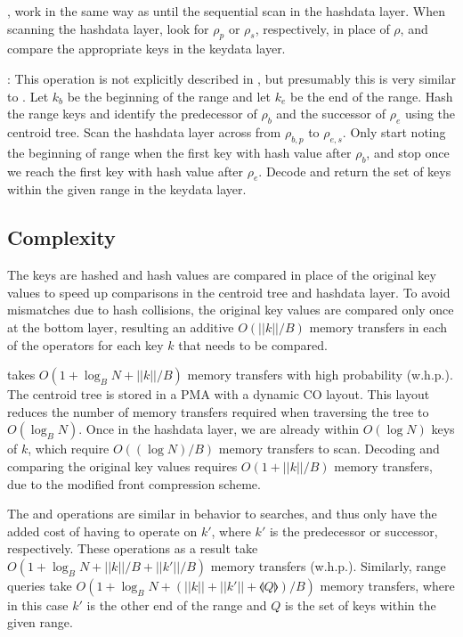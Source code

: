 \documentclass[preprint]{style}
\begin{document}
\Pred{}, \Succ{} work in the same way as \Search{} until the sequential scan in
the hashdata layer. When scanning the hashdata layer, look for $\rho_{p}$ or
$\rho_{s}$, respectively, in place of $\rho$, and compare the appropriate keys
in the keydata layer.

\Scan{}: This operation is not explicitly described in \cite{BenderFaKu06}, but
presumably this is very similar to \Search{}. Let $k_{b}$ be the beginning of
the range and let $k_{e}$ be the end of the range. Hash the range keys and
identify the predecessor of $\rho_{b}$ and the successor of $\rho_{e}$ using
the centroid tree. Scan the hashdata layer across from $\rho_{b,p}$ to
$\rho_{e,s}$. Only start noting the beginning of range when the first key with
hash value after $\rho_{b}$, and stop once we reach the first key with hash
value after $\rho_{e}$. Decode and return the set of keys within the given
range in the keydata layer.

\subsection{Complexity}
The keys are hashed and hash values are compared in place of the original key
values to speed up comparisons in the centroid tree and hashdata layer. To
avoid mismatches due to hash collisions, the original key values are compared
only once at the bottom layer, resulting an additive $O(||k||/B)$ memory
transfers in each of the operators for each key $k$ that needs to be compared.

\Search{} takes $O(1+\log_{B}N+||k||/B)$ memory transfers with high probability
(w.h.p.).  The centroid tree is stored in a PMA with a dynamic CO layout. This
layout reduces the number of memory transfers required when traversing the tree
to $O(\log_{B}{N})$.  Once in the hashdata layer, we are already within $O(\log{N})$
keys of $k$, which require $O((\log{N})/B)$ memory transfers to scan. Decoding
and comparing the original key values requires $O(1+||k||/B)$ memory transfers,
due to the modified front compression scheme.

The \Pred{} and \Succ{} operations are similar in behavior to searches, and
thus only have the added cost of having to operate on $k'$, where $k'$ is the
predecessor or successor, respectively. These operations as a result take
$O(1+\log_{B}N+||k||/B+||k'||/B)$ memory transfers (w.h.p.). Similarly, range
queries take $O(1+\log_{B}N+(||k||+||k'||+\llangle{}Q\rrangle{})/B)$ memory
transfers, where in this case $k'$ is the other end of the range and $Q$ is the
set of keys within the given range.
\end{document}
